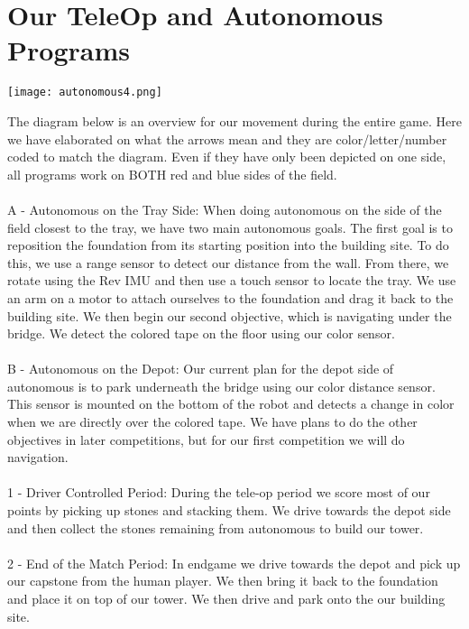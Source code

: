 \documentclass{article}
\begin{document}
\section{Our TeleOp and Autonomous Programs}

{\texttt{[image: autonomous4.png]}}

The diagram below is an overview for our movement during the entire game. Here we have elaborated on what the arrows mean and they are color/letter/number coded to match the diagram. Even if they have only been depicted on one side, all programs work on BOTH red and blue sides of the field.\\ \\

A - Autonomous on the Tray Side: When doing autonomous on the side of the field closest to the tray, we have two main autonomous goals. The first goal is to reposition the foundation from its starting position into the building site. To do this, we use a range sensor to detect our distance from the wall. From there, we rotate using the Rev IMU and then use a touch sensor to locate the tray. We use an arm on a motor to attach ourselves to the foundation and drag it back to the building site. We then begin our second objective, which is navigating under the bridge. We detect the colored tape on the floor using our color sensor.\\ \\

	B - Autonomous on the Depot: Our current plan for the depot side of autonomous is to park underneath the bridge using our color distance sensor. This sensor is mounted on the bottom of the robot and detects a change in color when we are directly over the colored tape. We have plans to do the other objectives in later competitions, but for our first competition we will do navigation.\\ \\ 

	1 - Driver Controlled Period: During the tele-op period we score most of our points by picking up stones and stacking them. We drive towards the depot side and then collect the stones remaining from autonomous to build our tower.\\ \\

	2 - End of the Match Period: In endgame we drive towards the depot and pick up our capstone from the human player. We then bring it back to the foundation and place it on top of our tower. We then drive and park onto the our building site.
\end{document}
